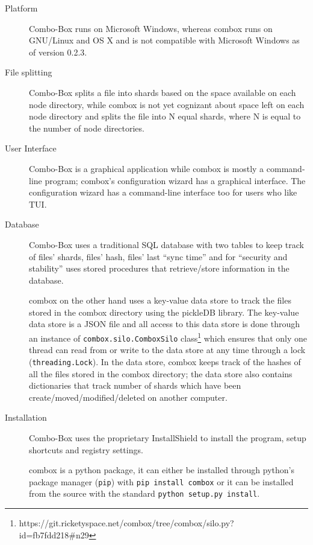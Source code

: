 \begin{description}
\item[Platform] Combo-Box runs on Microsoft Windows, whereas combox
  runs on GNU/Linux and OS X and is not compatible with Microsoft
  Windows as of version 0.2.3.
\item[File splitting] Combo-Box splits a file into shards based on the
  space available on each node directory\cite{vollmar-combo-box},
  while combox is not yet cognizant about space left on each node
  directory and splits the file into N equal shards, where N is equal
  to the number of node directories.
\item[User Interface] Combo-Box is a graphical application while
  combox is mostly a command-line program; combox's configuration
  wizard has a graphical interface. The configuration wizard has a
  command-line interface too for users who like TUI.
\item[Database] Combo-Box uses a traditional SQL database with two
  tables to keep track of files' shards, files' hash, files' last
  ``sync time'' and for ``security and stability'' uses stored
  procedures that retrieve/store information in the
  database\cite{vollmar-combo-box}.

  combox on the other hand uses a key-value data store to track the
  files stored in the combox directory using the pickleDB
  library\cite{pylib:pickledb}. The key-value data store is a JSON
  file and all access to this data store is done through an instance
  of \verb+combox.silo.ComboxSilo+
  class\footnote{https://git.ricketyspace.net/combox/tree/combox/silo.py?id=fb7fdd218\#n29}
  which ensures that only one thread can read from or write to the
  data store at any time through a lock (\verb+threading.Lock+). In
  the data store, combox keeps track of the hashes of all the files
  stored in the combox directory; the data store also contains
  dictionaries that track number of shards which have been
  create/moved/modified/deleted on another computer.

\item[Installation] Combo-Box uses the proprietary
  InstallShield\cite{nonfree-installshield} to install the program,
  setup shortcuts and registry settings\cite{vollmar-combo-box}.

  combox is a python package, it can either be installed through
  python's package manager (\verb+pip+\cite{py:pip}) with
  \verb+pip install combox+ or it can be installed from the source
  with the standard \verb+python setup.py install+.


\end{description}
